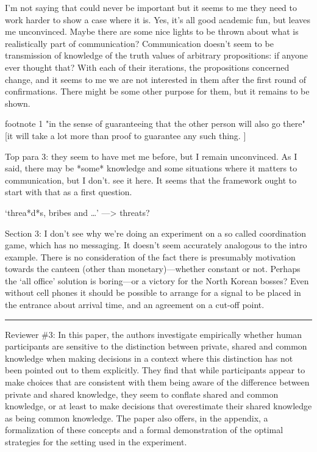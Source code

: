 \documentclass{article}
\begin{document}
I'm not saying that could never be important but it seems to me they need to work harder to show a case where it is. Yes, it's all good academic fun, but leaves me unconvinced. Maybe there are some nice lights to be thrown about what is realistically part of communication? Communication doesn't seem to be transmission of knowledge of the truth values of arbitrary propositions: if anyone ever thought that? With each of their iterations, the propositions concerned change, and it seems to me we are not interested in them after the first round of confirmations. There might be some other purpose for them, but it remains to be shown.

footnote 1 "in the sense of guaranteeing that the other person will also go there" [it will take a lot more than proof to guarantee any such thing. ]

Top para 3: they seem to have met me before, but I remain unconvinced. As I said, there may be *some* knowledge and some situations where it matters to communication, but I don't. see it here. It seems that the framework ought to start with that as a first question.

`threa*d*s, bribes and …' —> threats?

Section 3: I don't see why we're doing an experiment on a so called coordination game, which has no messaging. It doesn't seem accurately analogous to the intro example. There is no consideration of the fact there is presumably motivation towards the canteen (other than monetary)—whether constant or not. Perhaps the `all office' solution is boring—or a victory for the North Korean bosses? Even without cell phones it should be possible to arrange for a signal to be placed in the entrance about arrival time, and an agreement on a cut-off point.

\medskip
 \hrule
\medskip


Reviewer \#3: In this paper, the authors investigate empirically whether human participants are sensitive to the distinction between private, shared and common knowledge when making decisions in a context where this distinction has not been pointed out to them explicitly. They find that while participants appear to make choices that are consistent with them being aware of the difference between private and shared knowledge, they seem to conflate shared and common knowledge, or at least to make decisions that overestimate their shared knowledge as being common knowledge. The paper also offers, in the appendix, a formalization of these concepts and a formal demonstration of the optimal strategies for the setting used in the experiment.
\end{document}
